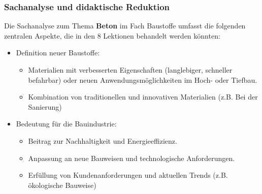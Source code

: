 \documentclass[
11pt,
captions=tableheading,
smallheadings,
headsepline,
footsepline, 
parskip=half-,
]{scrartcl}
\begin{document}
\subsubsection{Sachanalyse und didaktische Reduktion}
\label{sssec:Sachanalyse}
Die Sachanalyse zum Thema \textbf{Beton} im Fach Baustoffe umfasst die folgenden zentralen Aspekte, die in den 8 Lektionen behandelt werden könnten:

\begin{itemize}
    \item Definition neuer Baustoffe:
          \begin{itemize}
              \item Materialien mit verbesserten Eigenschaften (langlebiger, schneller befahrbar) oder neuen Anwendungsmöglichkeiten im Hoch- oder Tiefbau.
              \item Kombination von traditionellen und innovativen Materialien (z.B. Bei der Sanierung)
          \end{itemize}
    \item Bedeutung für die Bauindustrie:
          \begin{itemize}
              \item Beitrag zur Nachhaltigkeit und Energieeffizienz.
              \item Anpassung an neue Bauweisen und technologische Anforderungen.
              \item Erfüllung von Kundenanforderungen und aktuellen Trends (z.B. ökologische Bauweise)
          \end{itemize}
\end{itemize}
\end{document}
